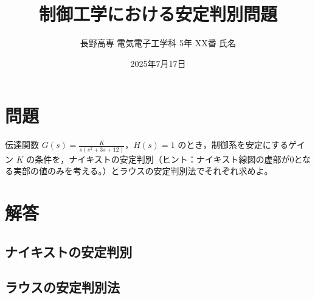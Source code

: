 \documentclass[11pt,a4paper]{ltjsarticle} %
\begin{document}
\title{制御工学における安定判別問題}
\author{長野高専 電気電子工学科 5年 XX番 氏名}
\date{2025年7月17日}
\maketitle
\thispagestyle{fancy}

\section{問題}
伝達関数 $G(s) = \frac{K}{s(s^2 + 3s + 12)}$，$H(s) = 1$ のとき，制御系を安定にするゲイン $K$ の条件を，ナイキストの安定判別（ヒント：ナイキスト線図の虚部が0となる実部の値のみを考える。）とラウスの安定判別法でそれぞれ求めよ。

\section{解答}

\subsection{ナイキストの安定判別}

\subsection{ラウスの安定判別法}
\end{document}
